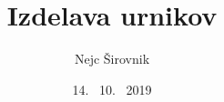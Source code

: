 \documentclass[a4paper, 10pt]{article}
\begin{document}

\title{Izdelava urnikov}
\author{Nejc Širovnik}
\date{14. \ 10. \ 2019}
\maketitle

{\theoremstyle{plain}
\newtheorem{izrek}{Izrek}
}


{\theoremstyle{definition}
\newtheorem{definicija}{Definicija}
}
\end{document}
